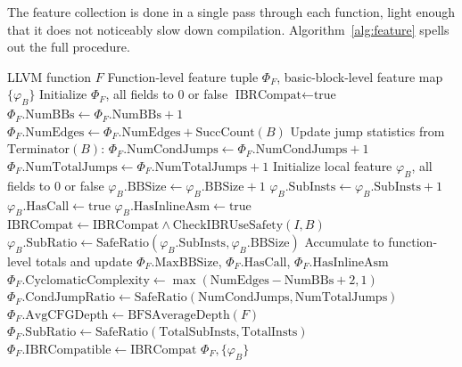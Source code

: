 \documentclass[5p,times,authoryear]{elsarticle}
\theoremstyle{plain}
\theoremstyle{definition}
\theoremstyle{remark}
\begin{document}
The feature collection is done in a single pass through each function, light enough
that it does not noticeably slow down compilation. Algorithm~\ref{alg:feature} spells
out the full procedure.

\begin{algorithm}[!t]
\footnotesize
\caption{MIXCOMPILE Feature Collection (FeatureCollection)}
\label{alg:feature}
\begin{algorithmic}[1]
    \Require LLVM function $F$
    \Ensure Function-level feature tuple $\Phi_F$, basic-block-level feature map $\{\varphi_B\}$
    \State Initialize $\Phi_F$, all fields to 0 or false
    \State $\text{IBRCompat} \gets \text{true}$
        \State $\Phi_F.\text{NumBBs} \gets \Phi_F.\text{NumBBs} + 1$
        \State $\Phi_F.\text{NumEdges} \gets \Phi_F.\text{NumEdges} + \text{SuccCount}(B)$
        \State Update jump statistics from $\text{Terminator}(B)$:
         \State $\Phi_F.\text{NumCondJumps} \gets \Phi_F.\text{NumCondJumps} + 1$ \EndIf
         \State $\Phi_F.\text{NumTotalJumps} \gets \Phi_F.\text{NumTotalJumps} + 1$ \EndIf
        \State Initialize local feature $\varphi_B$, all fields to 0 or false
            \State $\varphi_B.\text{BBSize} \gets \varphi_B.\text{BBSize} + 1$
             \State $\varphi_B.\text{SubInsts} \gets \varphi_B.\text{SubInsts} + 1$ \EndIf
                \State $\varphi_B.\text{HasCall} \gets \text{true}$
                 \State $\varphi_B.\text{HasInlineAsm} \gets \text{true}$ \EndIf
            \EndIf
                \State $\text{IBRCompat} \gets \text{IBRCompat} \land \text{CheckIBRUseSafety}(I, B)$
            \EndIf
        \EndFor
        \State $\varphi_B.\text{SubRatio} \gets \text{SafeRatio}(\varphi_B.\text{SubInsts}, \varphi_B.\text{BBSize})$
        \State Accumulate to function-level totals and update $\Phi_F.\text{MaxBBSize}$,
               $\Phi_F.\text{HasCall}$, $\Phi_F.\text{HasInlineAsm}$
    \EndFor
    \State $\Phi_F.\text{CyclomaticComplexity} \gets \max(\text{NumEdges} - \text{NumBBs} + 2, 1)$
    \State $\Phi_F.\text{CondJumpRatio} \gets \text{SafeRatio}(\text{NumCondJumps}, \text{NumTotalJumps})$
    \State $\Phi_F.\text{AvgCFGDepth} \gets \text{BFSAverageDepth}(F)$
    \State $\Phi_F.\text{SubRatio} \gets \text{SafeRatio}(\text{TotalSubInsts}, \text{TotalInsts})$
    \State $\Phi_F.\text{IBRCompatible} \gets \text{IBRCompat}$
    \Return $\Phi_F, \{\varphi_B\}$
\end{algorithmic}
\end{algorithm}
\end{document}
